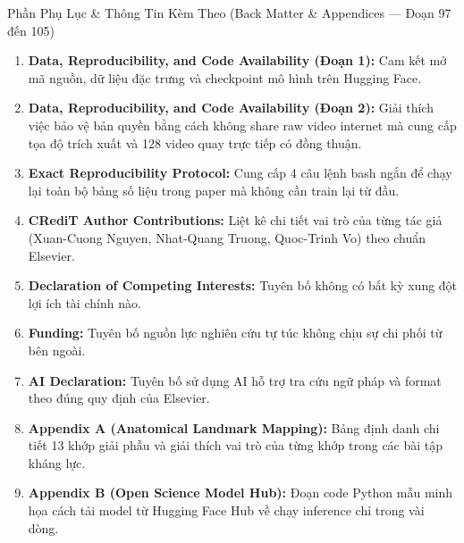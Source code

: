 \documentclass[10pt,a4paper]{article}
\begin{document}
\begin{secbox}{Phần Phụ Lục \& Thông Tin Kèm Theo (Back Matter \& Appendices — Đoạn 97 đến 105)}
\begin{enumerate}[leftmargin=*, itemsep=2pt, topsep=1pt, start=97]
    \item \textbf{Data, Reproducibility, and Code Availability (Đoạn 1):} Cam kết mở mã nguồn, dữ liệu đặc trưng và checkpoint mô hình trên Hugging Face.
    \item \textbf{Data, Reproducibility, and Code Availability (Đoạn 2):} Giải thích việc bảo vệ bản quyền bằng cách không share raw video internet mà cung cấp tọa độ trích xuất và 128 video quay trực tiếp có đồng thuận.
    \item \textbf{Exact Reproducibility Protocol:} Cung cấp 4 câu lệnh bash ngắn để chạy lại toàn bộ bảng số liệu trong paper mà không cần train lại từ đầu.
    \item \textbf{CRediT Author Contributions:} Liệt kê chi tiết vai trò của từng tác giả (Xuan-Cuong Nguyen, Nhat-Quang Truong, Quoc-Trinh Vo) theo chuẩn Elsevier.
    \item \textbf{Declaration of Competing Interests:} Tuyên bố không có bất kỳ xung đột lợi ích tài chính nào.
    \item \textbf{Funding:} Tuyên bố nguồn lực nghiên cứu tự túc không chịu sự chi phối từ bên ngoài.
    \item \textbf{AI Declaration:} Tuyên bố sử dụng AI hỗ trợ tra cứu ngữ pháp và format theo đúng quy định của Elsevier.
    \item \textbf{Appendix A (Anatomical Landmark Mapping):} Bảng định danh chi tiết 13 khớp giải phẫu và giải thích vai trò của từng khớp trong các bài tập kháng lực.
    \item \textbf{Appendix B (Open Science Model Hub):} Đoạn code Python mẫu minh họa cách tải model từ Hugging Face Hub về chạy inference chỉ trong vài dòng.
\end{enumerate}
\end{secbox}
\end{document}
